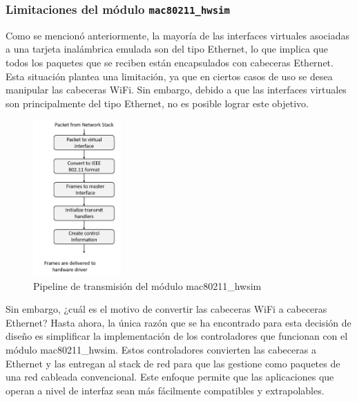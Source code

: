 \subsubsection{Limitaciones del módulo \texttt{mac80211\_hwsim}}
\label{limits}

Como se mencionó anteriormente, la mayoría de las interfaces virtuales asociadas a una tarjeta inalámbrica emulada son del tipo Ethernet, lo que implica que todos los paquetes que se reciben están encapsulados con cabeceras Ethernet. Esta situación plantea una limitación, ya que en ciertos casos de uso se desea manipular las cabeceras WiFi. Sin embargo, debido a que las interfaces virtuales son principalmente del tipo Ethernet, no es posible lograr este objetivo.

\begin{figure}[ht]
    \centering
    \includegraphics[width=0.3\textwidth]{archivos/img/teoria/linux_wireless_subsystem_tx.png}
    \caption{Pipeline de transmisión del módulo mac80211\_hwsim \cite{5415877}}
    \label{fig:analysis_p4_wifi_7}
\end{figure}

Sin embargo, ¿cuál es el motivo de convertir las cabeceras WiFi a cabeceras Ethernet? Hasta ahora, la única razón que se ha encontrado para esta decisión de diseño es simplificar la implementación de los controladores que funcionan con el módulo mac80211\_hwsim. Estos controladores convierten las cabeceras a Ethernet y las entregan al stack de red para que las gestione como paquetes de una red cableada convencional. Este enfoque permite que las aplicaciones que operan a nivel de interfaz sean más fácilmente compatibles y extrapolables.

